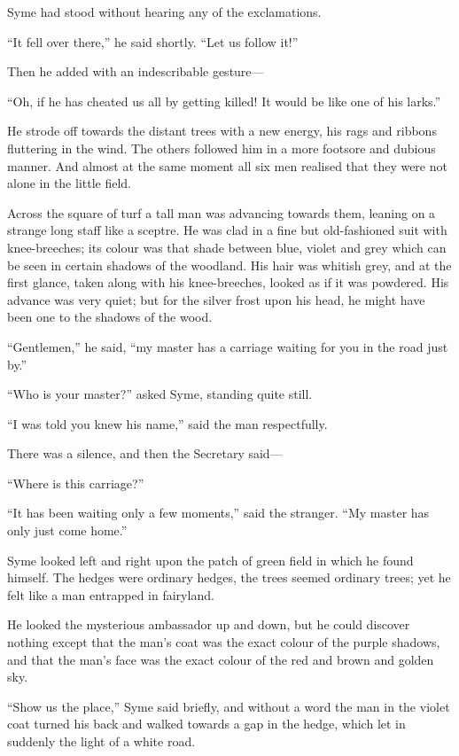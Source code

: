 Syme had stood without hearing any of the exclamations.

“It fell over there,” he said shortly. “Let us follow it!”

Then he added with an indescribable gesture⁠—

“Oh, if he has cheated us all by getting killed! It would be like one of his larks.”

He strode off towards the distant trees with a new energy, his rags and ribbons fluttering in the wind. The others followed him in a more footsore and dubious manner. And almost at the same moment all six men realised that they were not alone in the little field.

Across the square of turf a tall man was advancing towards them, leaning on a strange long staff like a sceptre. He was clad in a fine but old-fashioned suit with knee-breeches; its colour was that shade between blue, violet and grey which can be seen in certain shadows of the woodland. His hair was whitish grey, and at the first glance, taken along with his knee-breeches, looked as if it was powdered. His advance was very quiet; but for the silver frost upon his head, he might have been one to the shadows of the wood.

“Gentlemen,” he said, “my master has a carriage waiting for you in the road just by.”

“Who is your master?” asked Syme, standing quite still.

“I was told you knew his name,” said the man respectfully.

There was a silence, and then the Secretary said⁠—

“Where is this carriage?”

“It has been waiting only a few moments,” said the stranger. “My master has only just come home.”

Syme looked left and right upon the patch of green field in which he found himself. The hedges were ordinary hedges, the trees seemed ordinary trees; yet he felt like a man entrapped in fairyland.

He looked the mysterious ambassador up and down, but he could discover nothing except that the man’s coat was the exact colour of the purple shadows, and that the man’s face was the exact colour of the red and brown and golden sky.

“Show us the place,” Syme said briefly, and without a word the man in the violet coat turned his back and walked towards a gap in the hedge, which let in suddenly the light of a white road.

